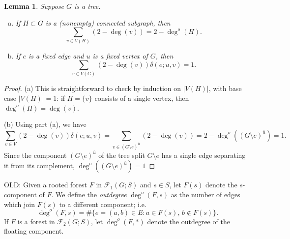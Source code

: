 \documentclass{amsart}
\newtheorem{lem}[thm]{Lemma}
\theoremstyle{definition}
\newcommand{\forests}{\mathcal{F}}
\newcommand{\degout}{\deg^o}
\begin{document}
\begin{lem}
\label{lem:outdeg-sum}
Suppose $G$ is a tree.
\begin{enumerate}[(a)]
\item 
If $H\subset G$ is a (nonempty) connected subgraph, then
\[
  \sum_{v \in V(H)} \left( 2 -  \deg(v) \right) = 2 - \degout(H) .
\]

\item 
If $e$ is a fixed edge and $u$ is a fixed vertex of $G$, then
\[
	\sum_{v \in V(G)} (2 - \deg(v)) \delta(e; u,v) = 1.
\]

\end{enumerate}
\end{lem}
\begin{proof}
(a)
This is straightforward to check by induction on $|V(H)|$,
with base case $|V(H)| = 1$:
if $H = \{v\}$ consists of a single vertex, then $\degout(H) = \deg(v)$.
%

(b)
Using part (a), we have
\[
	\sum_{v \in V} (2 - \deg(v)) \delta(e; u,v)
	= \sum_{v \in (G \setminus e)^{\overline u}} (2 - \deg(v))
	= 2 - \degout((G \setminus e)^{\overline u}) = 1. 
\] 
Since the component $(G \setminus e)^{\overline u}$ of the tree split $G \setminus e$ has a single edge separating it from its complement, 
$\degout((G \setminus e)^{\overline u}) = 1$
\end{proof}

OLD: Given a rooted forest $F$ in $\forests_1(G;S)$ and $s \in S$,
let $F(s)$ denote the $s$-component of $F$.
We define the {\em outdegree} $\degout(F,s)$ as the number of edges which join $F(s)$ to a different component; i.e.
\begin{equation}
\label{eq:outdeg}
	\degout(F,s) = \#\{ e = (a,b) \in E : a \in F(s),\, b \not\in F(s)\}.
\end{equation}
If $F$ is a forest in $\forests_2(G;S)$, let $\degout(F,*)$ denote the outdegree of the floating component.
\end{document}
